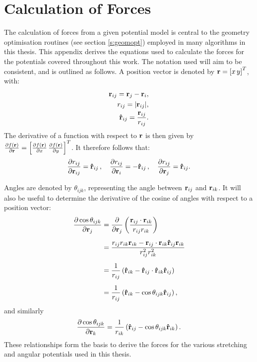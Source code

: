 \chapter{Calculation of Forces}
\label{app:forces}
\stoptocwriting
The calculation of forces from a given potential model is central to the geometry optimisation routines (see section \ref{s:geomopt}) employed in many algorithms in this thesis.
This appendix derives the equations used to calculate the forces for the potentials covered throughout this work.
The notation used will aim to be consistent, and is outlined as follows.
A position vector is denoted by $\mathbf{r}=\left[x\, y\right]^{T}$, with:
\begin{align}
	\mathbf{r}_{ij}=\mathbf{r}_j-\mathbf{r}_i, \\
	r_{ij}=\lvert\mathbf{r}_{ij}\rvert, \\
	\boldsymbol{\hat{\mathbf{r}}}_{ij}=\frac{\mathbf{r}_{ij}}{r_{ij}}.
\end{align}
The derivative of a function with respect to $\mathbf{r}$ is then given by $\frac{\partial f\left(\mathbf{r}\right) }{\partial \mathbf{r}}=\left[\frac{\partial f\left(\mathbf{r}\right)}{\partial x}\, \frac{\partial f\left(\mathbf{r}\right)}{\partial y}\right]^{T}$.
It therefore follows that:
\begin{align}
	\frac{\partial r_{ij}}{\partial\mathbf{r}_{ij}}=\boldsymbol{\hat{\mathbf{r}}}_{ij}\,,\quad \frac{\partial r_{ij}}{\partial \mathbf{r}_i}=-\boldsymbol{\hat{\mathbf{r}}}_{ij}\,,\quad \frac{\partial r_{ij}}{\partial \mathbf{r}_j}=\boldsymbol{\hat{\mathbf{r}}}_{ij} .
\end{align}

Angles are denoted by $\theta_{ijk}$, representing the angle between $\mathbf{r}_{ij}$ and $\mathbf{r}_{ik}$. 
It will also be useful to determine the derivative of the cosine of angles with respect to a position vector:
\begin{align}
	\frac{\partial \cos\theta_{ijk}}{\partial \mathbf{r}_j} &= \frac{\partial}{\partial \mathbf{r}_j}\left(\frac{\mathbf{r}_{ij}\cdot\mathbf{r}_{ik}}{r_{ij}r_{ik}}\right) \nonumber \\[0.5em]
	&= \frac{r_{ij}r_{ik}\mathbf{r}_{ik}-\mathbf{r}_{ij}\cdot\mathbf{r}_{ik}\boldsymbol{\hat{\mathbf{r}}}_{ij}\mathbf{r}_{ik}}{r_{ij}^2r_{ik}^2} \nonumber \\[0.5em]
	&= \frac{1}{r_{ij}}\left(\boldsymbol{\hat{\mathbf{r}}}_{ik}-\boldsymbol{\hat{\mathbf{r}}}_{ij}\cdot\boldsymbol{\hat{\mathbf{r}}}_{ik}\boldsymbol{\hat{\mathbf{r}}}_{ij}\right) \nonumber \\[0.5em]
	&= \frac{1}{r_{ij}}\left(\boldsymbol{\hat{\mathbf{r}}}_{ik}-\cos\theta_{ijk}\boldsymbol{\hat{\mathbf{r}}}_{ij}\right),
\end{align}
and similarly
\begin{equation}
	\frac{\partial \cos\theta_{ijk}}{\partial \mathbf{r}_k} = \frac{1}{r_{ik}}\left(\boldsymbol{\hat{\mathbf{r}}}_{ij}-\cos\theta_{ijk}\boldsymbol{\hat{\mathbf{r}}}_{ik}\right).
\end{equation}
These relationships form the basis to derive the forces for the various stretching and angular potentials used in this thesis.

